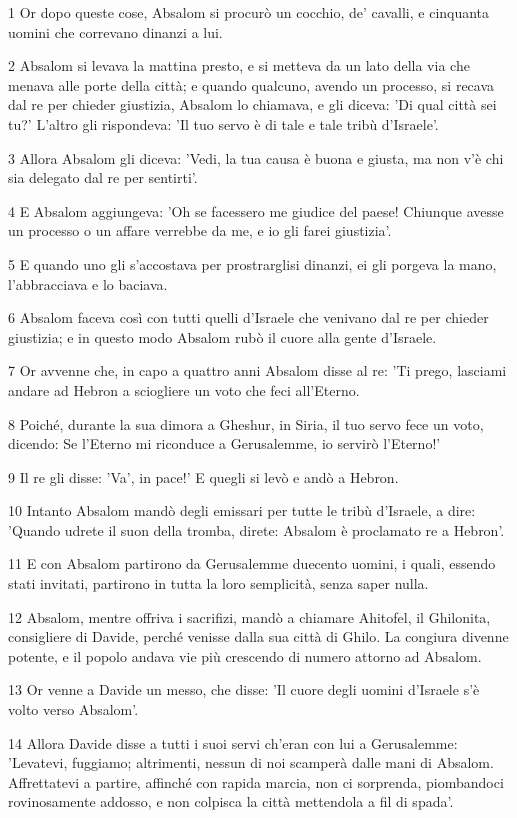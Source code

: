 \par 1 Or dopo queste cose, Absalom si procurò un cocchio, de' cavalli, e cinquanta uomini che correvano dinanzi a lui.
\par 2 Absalom si levava la mattina presto, e si metteva da un lato della via che menava alle porte della città; e quando qualcuno, avendo un processo, si recava dal re per chieder giustizia, Absalom lo chiamava, e gli diceva: 'Di qual città sei tu?' L'altro gli rispondeva: 'Il tuo servo è di tale e tale tribù d'Israele'.
\par 3 Allora Absalom gli diceva: 'Vedi, la tua causa è buona e giusta, ma non v'è chi sia delegato dal re per sentirti'.
\par 4 E Absalom aggiungeva: 'Oh se facessero me giudice del paese! Chiunque avesse un processo o un affare verrebbe da me, e io gli farei giustizia'.
\par 5 E quando uno gli s'accostava per prostrarglisi dinanzi, ei gli porgeva la mano, l'abbracciava e lo baciava.
\par 6 Absalom faceva così con tutti quelli d'Israele che venivano dal re per chieder giustizia; e in questo modo Absalom rubò il cuore alla gente d'Israele.
\par 7 Or avvenne che, in capo a quattro anni Absalom disse al re: 'Ti prego, lasciami andare ad Hebron a sciogliere un voto che feci all'Eterno.
\par 8 Poiché, durante la sua dimora a Gheshur, in Siria, il tuo servo fece un voto, dicendo: Se l'Eterno mi riconduce a Gerusalemme, io servirò l'Eterno!'
\par 9 Il re gli disse: 'Va', in pace!' E quegli si levò e andò a Hebron.
\par 10 Intanto Absalom mandò degli emissari per tutte le tribù d'Israele, a dire: 'Quando udrete il suon della tromba, direte: Absalom è proclamato re a Hebron'.
\par 11 E con Absalom partirono da Gerusalemme duecento uomini, i quali, essendo stati invitati, partirono in tutta la loro semplicità, senza saper nulla.
\par 12 Absalom, mentre offriva i sacrifizi, mandò a chiamare Ahitofel, il Ghilonita, consigliere di Davide, perché venisse dalla sua città di Ghilo. La congiura divenne potente, e il popolo andava vie più crescendo di numero attorno ad Absalom.
\par 13 Or venne a Davide un messo, che disse: 'Il cuore degli uomini d'Israele s'è volto verso Absalom'.
\par 14 Allora Davide disse a tutti i suoi servi ch'eran con lui a Gerusalemme: 'Levatevi, fuggiamo; altrimenti, nessun di noi scamperà dalle mani di Absalom. Affrettatevi a partire, affinché con rapida marcia, non ci sorprenda, piombandoci rovinosamente addosso, e non colpisca la città mettendola a fil di spada'.
